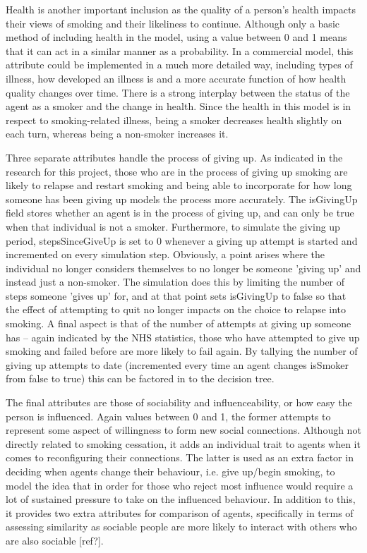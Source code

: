 \documentclass[]{report}
\begin{document}
Health is another important inclusion as the quality of a person's health impacts their views of smoking and their likeliness to continue\cite{NHS-43}. Although only a basic method of including health in the model, using a value between 0 and 1 means that it can act in a similar manner as a probability. In a commercial model, this attribute could be implemented in a much more detailed way, including types of illness, how developed an illness is and a more accurate function of how health quality changes over time. There is a strong interplay between the status of the agent as a smoker and the change in health. Since the health in this model is in respect to smoking-related illness, being a smoker decreases health slightly on each turn, whereas being a non-smoker increases it.

Three separate attributes handle the process of giving up. As indicated in the research for this project, those who are in the process of giving up smoking are likely to relapse and restart smoking\cite{NHS-44} and being able to incorporate for how long someone has been giving up models the process more accurately. The isGivingUp field stores whether an agent is in the process of giving up, and can only be true when that individual is not a smoker. Furthermore, to simulate the giving up period, stepsSinceGiveUp is set to 0 whenever a giving up attempt is started and incremented on every simulation step. Obviously, a point arises where the individual no longer considers themselves to no longer be someone 'giving up' and instead just a non-smoker. The simulation does this by limiting the number of steps someone 'gives up' for, and at that point sets isGivingUp to false so that the effect of attempting to quit no longer impacts on the choice to relapse into smoking. A final aspect is that of the number of attempts at giving up someone has – again indicated by the NHS statistics, those who have attempted to give up smoking and failed before are more likely to fail again\cite{NHS-44}. By tallying the number of giving up attempts to date (incremented every time an agent changes isSmoker from false to true) this can be factored in to the decision tree.

The final attributes are those of sociability and influenceability, or how easy the person is influenced. Again values between 0 and 1, the former attempts to represent some aspect of willingness to form new social connections. Although not directly related to smoking cessation, it adds an individual trait to agents when it comes to reconfiguring their connections. The latter is used as an extra factor in deciding when agents change their behaviour, i.e. give up/begin smoking, to model the idea that in order for those who reject most influence would require a lot of sustained pressure to take on the influenced behaviour. In addition to this, it provides two extra attributes for comparison of agents, specifically in terms of assessing similarity as sociable people are more likely to interact with others who are also sociable [ref?].
\end{document}
